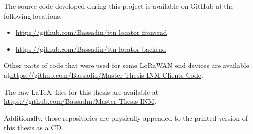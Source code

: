 
The source code developed during this project is available on GitHub at the following locations:

\begin{itemize}
    \item \url{https://github.com/Bassadin/ttn-locator-frontend}
    \item \url{https://github.com/Bassadin/ttn-locator-backend}
\end{itemize}

Other parts of code that were used for some \ac{LoRaWAN} end devices are available at\url{https://github.com/Bassadin/Master-Thesis-INM-Clients-Code}.

The raw \LaTeX~files for this thesis are available at \url{https://github.com/Bassadin/Master-Thesis-INM}.

Additionally, those repositories are physically appended to the printed version of this thesis as a CD.